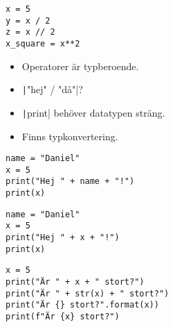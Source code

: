 \begin{frame}[fragile]
  \inputminted[highlightlines={12,25,28},linenos,firstline=11]{python}{examples/age.py}
\end{frame}

\begin{frame}[fragile]
  \begin{example}
    \begin{verbatim}
x = 5
y = x / 2
z = x // 2
x_square = x**2
    \end{verbatim}
  \end{example}

  \pause

  \begin{remark}
    \begin{itemize}
      \item Operatorer är typberoende.
      \item \texttt|"hej" / "då"|?
    \end{itemize}
  \end{remark}
\end{frame}

\begin{frame}[fragile]
  \begin{remark}
    \begin{itemize}
      \item \texttt|print| behöver datatypen sträng.
      \item Finns typkonvertering.
    \end{itemize}
  \end{remark}

  \begin{example}[Funkar]
    \begin{verbatim}
name = "Daniel"
x = 5
print("Hej " + name + "!")
print(x)
    \end{verbatim}
  \end{example}

  \begin{example}
    \begin{verbatim}
name = "Daniel"
x = 5
print("Hej " + x + "!")
print(x)
    \end{verbatim}
  \end{example}
\end{frame}

\begin{frame}[fragile]
  \begin{example}
    \begin{verbatim}
x = 5
print("Är " + x + " stort?")
print("Är " + str(x) + " stort?")
print("Är {} stort?".format(x))
print(f"Är {x} stort?")
    \end{verbatim}
  \end{example}
\end{frame}

